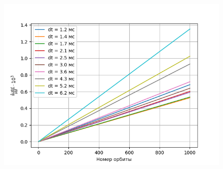 \documentclass[a4paper,12pt]{article}
\begin{document}
\begin{enumerate}
\begin{figure}[H]
  \centering
  \includegraphics[width=1\linewidth]{images/asm4_8.png}
  \caption{}
\end{figure}

\end{enumerate}
\end{document}
